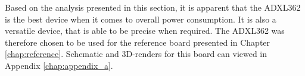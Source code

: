 Based on the analysis presented in this section, it is apparent that the ADXL362 is the best device when it comes to overall power consumption. It is also a versatile device, that is able to be precise when required. The ADXL362 was therefore chosen to be used for the reference board presented in Chapter \ref{chap:reference}. Schematic and 3D-renders for this board can viewed in Appendix \ref{chap:appendix_a}.